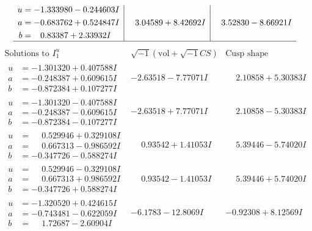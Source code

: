 \documentclass[1p]{elsarticle_modified}
\theoremstyle{definition}
\newcommand{\I}{\sqrt{-1}}
\begin{document}
$$\begin{array}{c|c|c}
\begin{aligned}
u &= -1.333980 - 0.244603 I \\
a &= -0.683762 + 0.524847 I \\
b &= \phantom{-}0.83387 + 2.33932 I\end{aligned}
 & \phantom{-}3.04589 + 8.42692 I & \phantom{-}3.52830 - 8.66921 I\\
 \hline 
 \end{array}$$\newpage$$\begin{array}{c|c|c}  
\text{Solutions to }I^u_{1}& \I (\text{vol} + \sqrt{-1}CS) & \text{Cusp shape}\\
 \hline 
\begin{aligned}
u &= -1.301320 + 0.407588 I \\
a &= -0.248387 + 0.609615 I \\
b &= -0.872384 + 0.107277 I\end{aligned}
 & -2.63518 - 7.77071 I & \phantom{-}2.10858 + 5.30383 I \\ \hline\begin{aligned}
u &= -1.301320 - 0.407588 I \\
a &= -0.248387 - 0.609615 I \\
b &= -0.872384 - 0.107277 I\end{aligned}
 & -2.63518 + 7.77071 I & \phantom{-}2.10858 - 5.30383 I \\ \hline\begin{aligned}
u &= \phantom{-}0.529946 + 0.329108 I \\
a &= \phantom{-}0.667313 - 0.986592 I \\
b &= -0.347726 - 0.588274 I\end{aligned}
 & \phantom{-}0.93542 + 1.41053 I & \phantom{-}5.39446 - 5.74020 I \\ \hline\begin{aligned}
u &= \phantom{-}0.529946 - 0.329108 I \\
a &= \phantom{-}0.667313 + 0.986592 I \\
b &= -0.347726 + 0.588274 I\end{aligned}
 & \phantom{-}0.93542 - 1.41053 I & \phantom{-}5.39446 + 5.74020 I \\ \hline\begin{aligned}
u &= -1.320520 + 0.424615 I \\
a &= -0.743481 - 0.622059 I \\
b &= \phantom{-}1.72687 - 2.60904 I\end{aligned}
 & -6.1783 - 12.8069 I & -0.92308 + 8.12569 I \\ \hline\begin{aligned}

\end{aligned}
\end{array}$$
\end{document}

